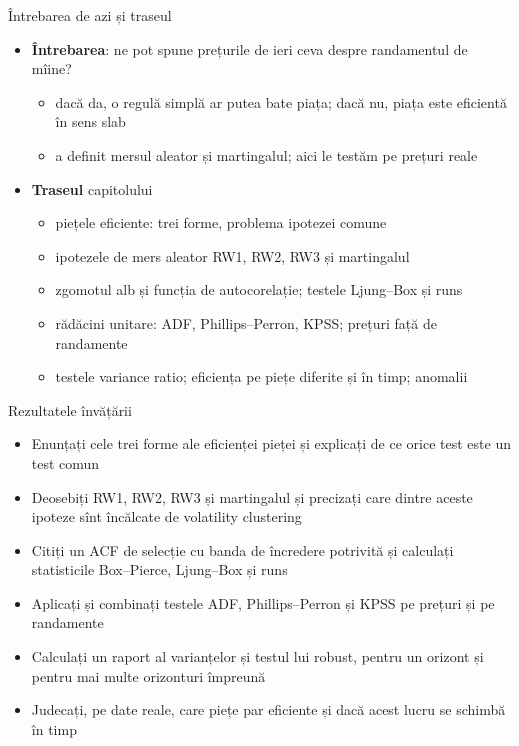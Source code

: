 \begin{frame}{Întrebarea de azi și traseul}
\itemsize{\small}
\begin{itemize}
    \item \textbf{Întrebarea}: ne pot spune prețurile de ieri ceva despre randamentul de mîine?
    \begin{itemize}
        \item dacă da, o regulă simplă ar putea bate piața; dacă nu, piața este eficientă în sens slab
        \item {} a definit mersul aleator și martingalul; aici le testăm pe prețuri reale
    \end{itemize}
    \item \textbf{Traseul} capitolului
    \begin{itemize}
        \item piețele eficiente: trei forme, problema ipotezei comune
        \item ipotezele de mers aleator RW1, RW2, RW3 și martingalul
        \item zgomotul alb și funcția de autocorelație; testele Ljung--Box și runs
        \item rădăcini unitare: ADF, Phillips--Perron, KPSS; prețuri față de randamente
        \item testele variance ratio; eficiența pe piețe diferite și în timp; anomalii
    \end{itemize}
\end{itemize}
\end{frame}

\begin{frame}{Rezultatele învățării}
\itemsize{\small}
\begin{itemize}
    \item Enunțați cele trei forme ale eficienței pieței și explicați de ce orice test este un test comun
    \item Deosebiți RW1, RW2, RW3 și martingalul și precizați care dintre aceste ipoteze sînt încălcate de volatility clustering
    \item Citiți un ACF de selecție cu banda de încredere potrivită și calculați statisticile Box--Pierce, Ljung--Box și runs
    \item Aplicați și combinați testele ADF, Phillips--Perron și KPSS pe prețuri și pe randamente
    \item Calculați un raport al varianțelor și testul lui robust, pentru un orizont și pentru mai multe orizonturi împreună
    \item Judecați, pe date reale, care piețe par eficiente și dacă acest lucru se schimbă în timp
\end{itemize}
\end{frame}

